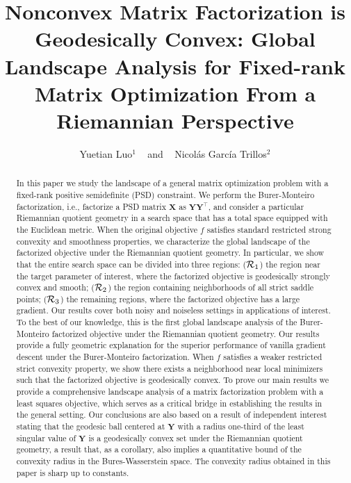 \documentclass[11pt]{article}
\newcommand{\0}{{\mathbf{0}}}
\newcommand{\1}{{\mathbf{1}}}
\newcommand{\X}{{\mathbf{X}}}
\newcommand{\Y}{{\mathbf{Y}}}
\newcommand{\cR}{{\cal R}}
\begin{document}
	\title{Nonconvex Matrix Factorization is Geodesically Convex: Global Landscape Analysis for Fixed-rank Matrix Optimization From a Riemannian Perspective}
	
	\author{Yuetian Luo$^1$ ~ and ~ Nicol{\'a}s Garc{\'i}a Trillos$^2$ }
	
	\date{}
	\maketitle

	
	\bigskip

\begin{abstract}
In this paper we study the landscape of a general matrix optimization problem with a fixed-rank positive semidefinite (PSD) constraint. We perform the Burer-Monteiro factorization, i.e., factorize a PSD matrix $\X$ as $\Y \Y^\top$, and consider a particular Riemannian quotient geometry in a search space that has a total space equipped with the Euclidean metric. When the original objective $f$ satisfies standard restricted strong convexity and smoothness properties, we characterize the global landscape of the factorized objective under the Riemannian quotient geometry. In particular, we show that the entire search space can be divided into three regions: ($\cR_1$) the region near the target parameter of interest, where the factorized objective is geodesically strongly convex and smooth; ($\cR_2$) the region containing neighborhoods of all strict saddle points; ($\cR_3$) the remaining regions, where the factorized objective has a large gradient. Our results cover both noisy and noiseless settings in applications of interest. To the best of our knowledge, this is the first global landscape analysis of the Burer-Monteiro factorized objective under the Riemannian quotient geometry. Our results provide a fully geometric explanation for the superior performance of vanilla gradient descent under the Burer-Monteiro factorization. When $f$ satisfies a weaker restricted strict convexity property, we show there exists a neighborhood near local minimizers such that the factorized objective is geodesically convex. To prove our main results we provide a comprehensive landscape analysis of a matrix factorization problem with a least squares objective, which serves as a critical bridge in establishing the results in the general setting. Our conclusions are also based on a result of independent interest stating that the geodesic ball centered at $\Y$ with a radius one-third of the least singular value of $\Y$ is a geodesically convex set under the Riemannian quotient geometry, a result that, as a corollary, also implies a quantitative bound of the convexity radius in the Bures-Wasserstein space. The convexity radius obtained in this paper is sharp up to constants.
\end{abstract}
\end{document}
